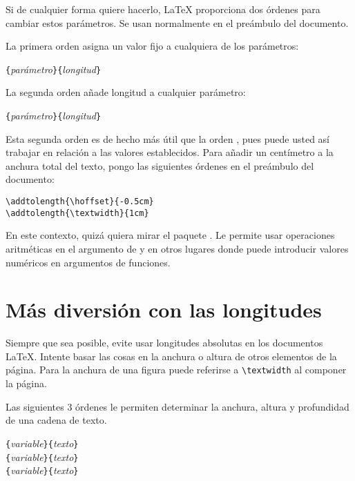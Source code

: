 Si de cualquier forma quiere hacerlo, \LaTeX{} proporciona dos órdenes para cambiar estos parámetros.  Se usan normalmente en el preámbulo del documento.

La primera orden asigna un valor fijo a cualquiera de los parámetros:
\begin{lscommand}
\verb|{|\emph{parámetro}\verb|}{|\emph{longitud}\verb|}|
\end{lscommand}

La segunda orden añade longitud a cualquier parámetro:
\begin{lscommand}
\verb|{|\emph{parámetro}\verb|}{|\emph{longitud}\verb|}|
\end{lscommand} 

Esta segunda orden es de hecho más útil que la orden , pues puede usted así trabajar en relación a las valores establecidos. Para añadir un centímetro a la anchura total del texto, pongo las siguientes órdenes en el preámbulo del documento:
\begin{code}
\verb|\addtolength{\hoffset}{-0.5cm}|\\
\verb|\addtolength{\textwidth}{1cm}|
\end{code}

En este  contexto, quizá quiera mirar el paquete .  Le permite usar operaciones aritméticas en el argumento de  y en otros lugares donde puede introducir valores numéricos en argumentos de funciones.

\section{Más diversión con las longitudes}

Siempre que sea posible, evite usar longitudes absolutas en los documentos \LaTeX{}.  Intente basar las cosas en la anchura o altura de otros elementos de la página.  Para la anchura de una figura puede referirse a \verb|\textwidth| al componer la página.

Las siguientes 3 órdenes le permiten determinar la anchura, altura y profundidad de una cadena de texto.

\begin{lscommand}
\verb|{|\emph{variable}\verb|}{|\emph{texto}\verb|}|\\
\verb|{|\emph{variable}\verb|}{|\emph{texto}\verb|}|\\
\verb|{|\emph{variable}\verb|}{|\emph{texto}\verb|}|
\end{lscommand}

